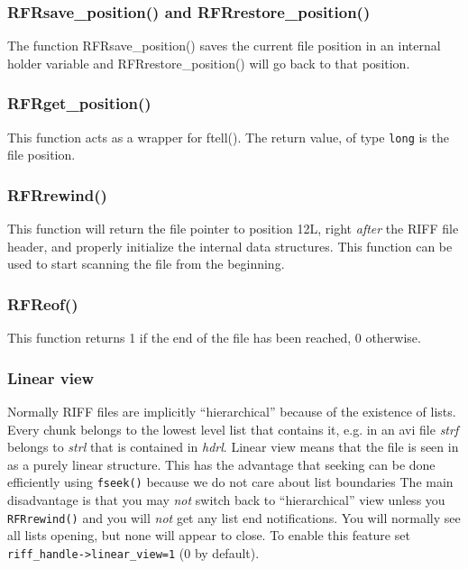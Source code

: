 \documentclass[12pt, a4paper]{article}
\begin{document}
\subsubsection{RFRsave\_position() and RFRrestore\_position()}
The function RFRsave\_position() saves the current file position in an internal
holder variable and RFRrestore\_position() will go back to that position.

\subsubsection{RFRget\_position()}
This function acts as a wrapper for ftell(). The return value, of type \verb+long+
is the file position.

\subsubsection{RFRrewind()}
This function will return the file pointer to position 12L, right \emph{after}
the RIFF file header, and properly initialize the internal data structures.
This function can be used to start scanning the file from the beginning.

\subsubsection{RFReof()}
This function returns 1 if the end of the file has been reached, 0 otherwise.

\subsubsection{Linear view}

Normally RIFF files are implicitly ``hierarchical'' because of the
existence of lists. Every chunk belongs to the lowest level list that contains it, e.g.
in an avi file {\it strf\/} belongs to {\it strl\/} that is contained in {\it hdrl\/}. 
Linear view means that the file is seen in as a purely linear structure.
This has the advantage that seeking can be done efficiently using \verb+fseek()+ 
because we do not care about list boundaries
The main disadvantage is that you may \emph{not} switch 
back to ``hierarchical'' view unless you \verb+RFRrewind()+ and you will \emph{not} get 
any list end notifications. You will normally
see all lists opening, but none will appear to close. To enable this feature set 
\verb+riff_handle->linear_view=1+ (0 by default).
\end{document}
